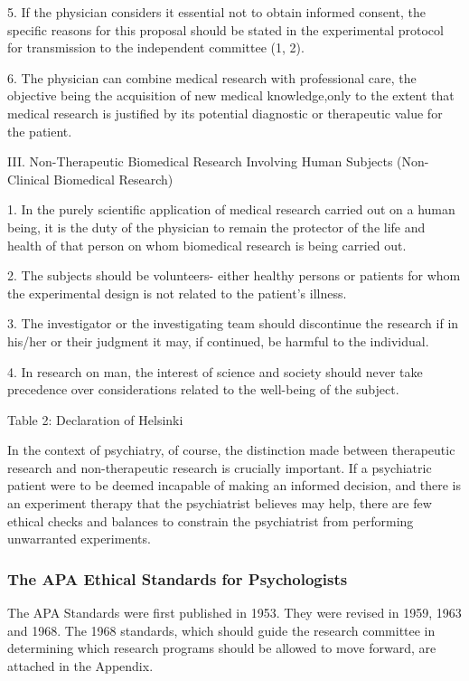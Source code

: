 {{   5. If the physician considers it essential not to obtain informed consent, the specific reasons for this proposal should be stated in the experimental protocol for transmission to the independent committee (1, 2).

   6. The physician can combine medical research with professional care, the objective being the acquisition of new medical knowledge,only to the extent that medical research is justified by its potential diagnostic or therapeutic value for the patient.

III. Non-Therapeutic Biomedical Research Involving Human Subjects (Non-Clinical Biomedical Research)

   1. In the purely scientific application of medical research carried out on a human being, it is the duty of the physician to remain the protector of the life and health of that person on whom biomedical research is being carried out.

   2. The subjects should be volunteers- either healthy persons or patients for whom the experimental design is not related to the patient's illness.

   3. The investigator or the investigating team should discontinue the research if in his/her or their judgment it may, if continued, be harmful to the individual.

4.  In research on man, the interest of science and society should never take precedence over considerations related to the well-being of the subject.
}} 

Table 2: Declaration of Helsinki

In the context of psychiatry, of course, the distinction made between therapeutic research and non-therapeutic research is crucially important. If a psychiatric patient were to be deemed incapable of making an informed decision, and there is an experiment therapy that the psychiatrist believes may help, there are few ethical checks and balances to constrain the psychiatrist from performing unwarranted experiments.

\subsubsection{The APA Ethical Standards for Psychologists}
\label{theapaethicalstandardsforpsychologists}

The APA Standards were first published in 1953. They were revised in 1959, 1963 and 1968. The 1968 standards, which should guide the research committee in determining which research programs should be allowed to move forward, are attached in the Appendix.

